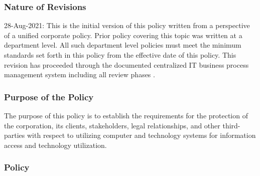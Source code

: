 \documentclass[stu]{apa7}
\begin{document}
\subsubsection{Nature of Revisions}
\label{sec:org8ff5c12}

28-Aug-2021: This is the initial version of this policy written from a perspective of a unified corporate policy. Prior policy covering this topic was written at a department level. All such department level policies must meet the minimum standards set forth in this policy from the effective date of this policy. This revision has proceeded through the documented centralized IT business process management system including all review phases \cite{wagleDevelopmentEffectiveCentralized2021}.

\subsubsection{Purpose of the Policy}
\label{sec:org8916dce}

The purpose of this policy is to establish the requirements for the protection of the corporation, its clients, stakeholders, legal relationships, and other third-parties with respect to utilizing computer and technology systems for information access and technology utilization.


\subsubsection{Policy}
\label{sec:orgbfb451a}
\end{document}
